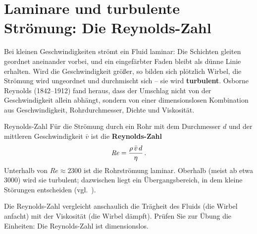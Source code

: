 \section{Laminare und turbulente Strömung: Die Reynolds-Zahl}\label{sec: reynolds}
Bei kleinen Geschwindigkeiten strömt ein Fluid laminar: Die Schichten gleiten geordnet aneinander vorbei, und ein eingefärbter Faden bleibt als dünne Linie erhalten. Wird die Geschwindigkeit größer, so bilden sich plötzlich Wirbel, die Strömung wird ungeordnet und durchmischt sich -- sie wird \textbf{turbulent}. Osborne Reynolds (1842--1912) fand heraus, dass der Umschlag nicht von der Geschwindigkeit allein abhängt, sondern von einer dimensionslosen Kombination aus Geschwindigkeit, Rohrdurchmesser, Dichte und Viskosität.

\begin{rememberbox}{Reynolds-Zahl}
    Für die Strömung durch ein Rohr mit dem Durchmesser $d$ und der mittleren Geschwindigkeit $\bar{v}$ ist die \textbf{Reynolds-Zahl}
    \begin{equation}\label{eq: reynolds}
        \mathit{Re} = \frac{\rho \, \bar{v} \, d}{\eta} \,.
    \end{equation}
    Unterhalb von $\mathit{Re} \approx 2300$ ist die Rohrströmung laminar. Oberhalb (meist ab etwa 3000) wird sie turbulent; dazwischen liegt ein Übergangsbereich, in dem kleine Störungen entscheiden (vgl.~\cite[S.~399]{Tipler2015}).
\end{rememberbox}
Die Reynolds-Zahl vergleicht anschaulich die Trägheit des Fluids (die Wirbel anfacht) mit der Viskosität (die Wirbel dämpft). Prüfen Sie zur Übung die Einheiten: Die Reynolds-Zahl ist dimensionslos.

